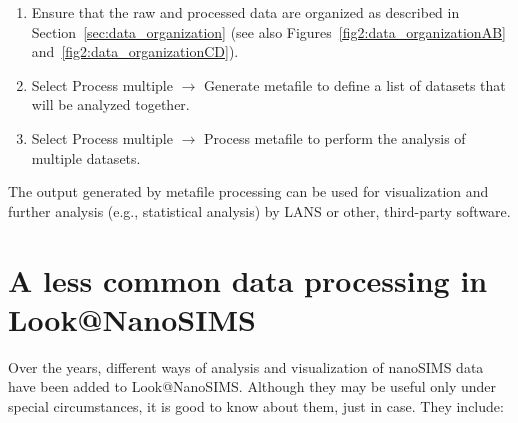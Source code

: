\documentclass[a4paper, 11pt]{article}
\newcommand{\lans}[1]{{\color{magenta}#1}}
\newcommand\ra{\rightarrow}
\newcommand\addon[1]{-- {\small #1}}
\begin{document}
\begin{enumerate}

\item Ensure that the raw and processed data are organized as described in Section~\ref{sec:data_organization} (see also Figures~\ref{fig2:data_organizationAB} and~\ref{fig2:data_organizationCD}).

\item Select \lans{Process multiple} $\ra$ \lans{Generate metafile} to define a list of datasets that will be analyzed together.


\item Select \lans{Process multiple} $\ra$ \lans{Process metafile} to perform the analysis of multiple datasets.

\end{enumerate}
%
The output generated by metafile processing can be used for visualization and further analysis (e.g., statistical analysis) by LANS or other, third-party software.


\section{A less common data processing in Look@NanoSIMS}

Over the years, different ways of analysis and visualization of nanoSIMS data have been added to Look@NanoSIMS. Although they may be useful only under special circumstances, it is good to know about them, just in case. They include:
\end{document}
